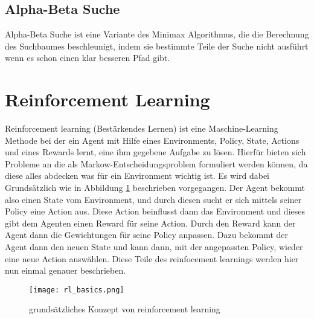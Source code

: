 \subsection{Alpha-Beta Suche}
Alpha-Beta Suche ist eine Variante des Minimax Algorithmus, die die Berechnung des Suchbaumes beschleunigt, indem sie bestimmte Teile der Suche nicht ausführt wenn es schon einen klar besseren Pfad gibt.

\section{Reinforcement Learning}
Reinforcement learning (Bestärkendes Lernen) ist eine Maschine-Learning Methode bei der ein Agent mit Hilfe eines Environments, Policy, State, Actions und eines Rewards lernt, eine ihm gegebene Aufgabe zu lösen. Hierfür bieten sich Probleme an die als Markow-Entscheidungsproblem\cite{Martijn2012} formuliert werden können, da diese alles abdecken was für ein Environment wichtig ist. Es wird dabei Grundsätzlich wie in Abbildung \ref{fig:rl_basic} beschrieben vorgegangen. Der Agent bekommt also einen State vom Environment, und durch diesen sucht  er sich mittels seiner Policy eine Action aus. Diese Action beinflusst dann das Environment und dieses gibt dem Agenten einen Reward für seine Action. Durch den Reward kann der Agent dann die Gewichtungen für seine Policy anpassen. Dazu bekommt der Agent dann den neuen State und kann dann, mit der angepassten Policy, wieder eine neue Action auswählen. Diese Teile des reinfocement learnings werden hier nun einmal genauer beschrieben.\\

\begin{figure}[h!]
  \texttt{[image: rl\_basics.png]}
  \centering
  \caption{grundsätzliches Konzept von reinforcement learning}
  \label{fig:rl_basic}
\end{figure}

